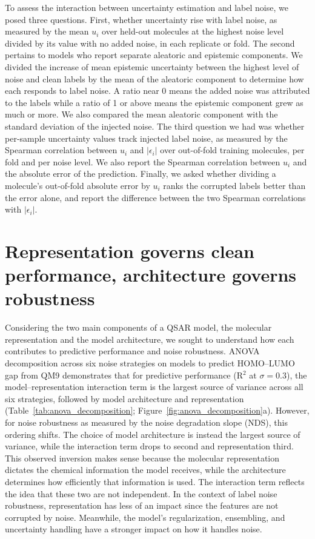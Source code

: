 To assess the interaction between uncertainty estimation and label noise, we posed three questions. First, whether uncertainty rise with label noise, as measured by the mean $u_i$ over held-out molecules at the highest noise level
divided by its value with no added noise, in each replicate or fold. The second pertains to models who report separate aleatoric and epistemic components. We divided the increase of mean epistemic uncertainty between the highest level of noise and clean labels by the mean of the aleatoric component to determine how each responds to label noise. A ratio near 0 means the added noise was attributed to the labels while a ratio of 1 or above means the epistemic component grew as much or more. We also compared the mean aleatoric component with the standard deviation of the injected noise. The third question we had was whether per-sample uncertainty values track injected label noise, as measured by the Spearman correlation between $u_i$ and $|\epsilon_i|$ over out-of-fold training molecules, per fold and per noise level. We also report the Spearman correlation between $u_i$ and the absolute error of the prediction. Finally, we asked whether dividing a molecule's out-of-fold absolute error by $u_i$ ranks the corrupted labels better than the error alone, and report the difference between the two Spearman correlations with $|\epsilon_i|$.


\section{Representation governs clean performance, architecture governs robustness}


Considering the two main components of a QSAR model, the molecular representation and the model architecture, we sought to understand how each contributes to predictive performance and noise robustness. ANOVA decomposition across six noise strategies on models to predict HOMO--LUMO gap from QM9 demonstrates that for predictive performance (R$^2$ at $\sigma = 0.3$), the model--representation interaction term is the  largest source of variance across all six strategies, followed by model architecture and representation (Table~\ref{tab:anova_decomposition}; Figure~\ref{fig:anova_decomposition}a). However, for noise robustness as measured by the noise degradation slope (NDS), this ordering shifts. The choice of model architecture is instead the largest source of variance, while the interaction term drops to second and representation third. This observed inversion makes sense because the molecular representation dictates the chemical information the model receives, while the architecture determines how efficiently that information is used. The interaction term reflects the idea that these two are not independent. In the context of label noise robustness, representation has less of an impact since the features are not corrupted by noise. Meanwhile, the model's regularization, ensembling, and uncertainty handling have a stronger impact on how it handles noise. 

